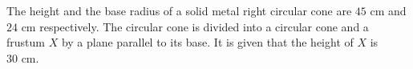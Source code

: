 
\question
The height and the base radius of a solid metal right circular cone are $45\text{ cm}$ and $24\text{ cm}$ respectively. The circular cone is divided into a circular cone and a frustum $X$ by a plane parallel to its base. It is given that the height of $X$ is $30\text{ cm}$.

